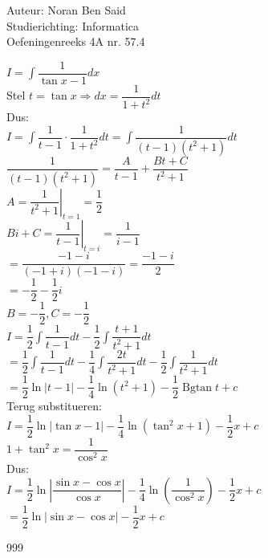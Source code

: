 \documentclass[a4paper]{article}
\begin{document}
\noindent \large Auteur: Noran Ben Said \\
\noindent \large Studierichting:  Informatica\\
\noindent \large Oefeningenreeks 4A nr. 57.4\\

\medskip

\normalsize

$I = \displaystyle\int \dfrac{1}{\tan x-1}dx$\\

Stel $ t=\tan x \Rightarrow dx=\dfrac{1}{1+t^2}dt$\\

Dus:\\

$ I=\displaystyle\int\dfrac{1}{t-1}\cdot\dfrac{1}{1+t^2}dt =\displaystyle\int\dfrac{1}{(t-1)(t^2+1)}dt$\\

$ \dfrac{1}{(t-1)(t^2+1)}=\dfrac{A}{t-1}+\dfrac{Bt+C}{t^2+1}$\\

$ A=\left.\dfrac{1}{t^2+1}\right|_{t=1}=\dfrac{1}{2}$\\

$ Bi+C=\left.\dfrac{1}{t-1}\right|_{t=i}=\dfrac{1}{i-1}$\\

$ =\dfrac{-1-i}{(-1+i)(-1-i)}=\dfrac{-1-i}{2}$\\

$ =-\dfrac{1}{2}-\dfrac{1}{2}i$\\

$ B=-\dfrac{1}{2},C=-\dfrac{1}{2}$\\

$ I=\dfrac{1}{2}\displaystyle\int\dfrac{1}{t-1}dt-\dfrac{1}{2}\displaystyle\int\dfrac{t+1}{t^2+1}dt$\\

$ =\dfrac{1}{2}\displaystyle\int\dfrac{1}{t-1}dt-\dfrac{1}{4}\displaystyle\int\dfrac{2t}{t^2+1}dt-\dfrac{1}{2}\displaystyle\int\dfrac{1}{t^2+1}dt$\\

$ =\dfrac{1}{2}\ln|t-1|-\dfrac{1}{4}\ln(t^2+1)-\dfrac{1}{2}\operatorname{Bgtan}t+c$\\

Terug substitueren:\\

$ I=\dfrac{1}{2}\ln|\tan x-1|-\dfrac{1}{4}\ln(\tan^2x+1)-\dfrac{1}{2}x+c$\\

$ 1+\tan^2x=\dfrac{1}{\cos^2x}$\\

Dus:\\

$ I=\dfrac{1}{2}\ln\left|\dfrac{\sin x-\cos x}{\cos x}\right|-\dfrac{1}{4}\ln\left(\dfrac{1}{\cos^2x}\right)-\dfrac{1}{2}x+c$\\

$ =\dfrac{1}{2}\ln|\sin x-\cos x|-\dfrac{1}{2}x+c$\\

\begin{thebibliography}{999}
\end{thebibliography}
\end{document}
